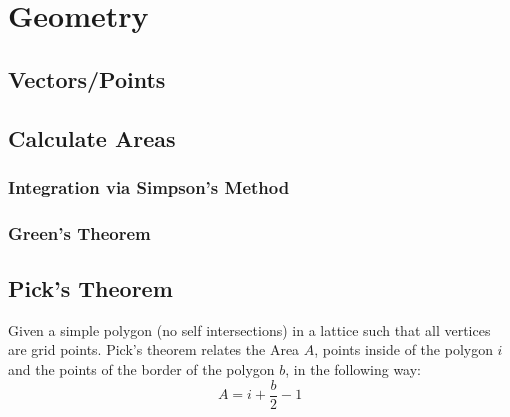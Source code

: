 \documentclass[../Notes/main.tex]{subfiles}
\begin{document}
\section{Geometry}
\subsection{Vectors/Points}

\subsection{Calculate Areas}
\subsubsection{Integration via Simpson's Method}

\subsubsection{Green's Theorem}

\subsection{Pick's Theorem}
Given a simple polygon (no self intersections) in a lattice such that all vertices are grid points. Pick's theorem relates the Area \(A\), points inside of the polygon \(i\) and the points of the border of the polygon \(b\), in the following way:
\begin{equation*}
    A=i+\frac{b}2-1
\end{equation*}
\end{document}
